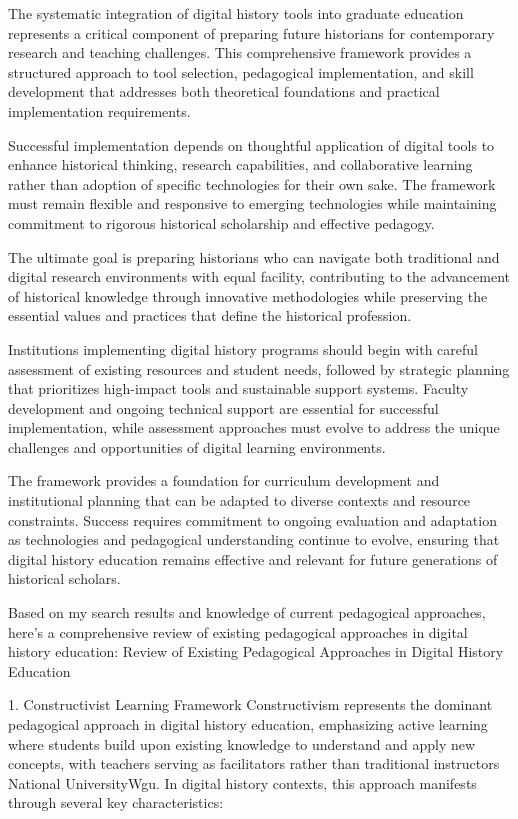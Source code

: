 The systematic integration of digital history tools into graduate education represents a critical component of preparing future historians for contemporary research and teaching challenges. This comprehensive framework provides a structured approach to tool selection, pedagogical implementation, and skill development that addresses both theoretical foundations and practical implementation requirements.

Successful implementation depends on thoughtful application of digital tools to enhance historical thinking, research capabilities, and collaborative learning rather than adoption of specific technologies for their own sake. The framework must remain flexible and responsive to emerging technologies while maintaining commitment to rigorous historical scholarship and effective pedagogy.

The ultimate goal is preparing historians who can navigate both traditional and digital research environments with equal facility, contributing to the advancement of historical knowledge through innovative methodologies while preserving the essential values and practices that define the historical profession.

Institutions implementing digital history programs should begin with careful assessment of existing resources and student needs, followed by strategic planning that prioritizes high-impact tools and sustainable support systems. Faculty development and ongoing technical support are essential for successful implementation, while assessment approaches must evolve to address the unique challenges and opportunities of digital learning environments.

The framework provides a foundation for curriculum development and institutional planning that can be adapted to diverse contexts and resource constraints. Success requires commitment to ongoing evaluation and adaptation as technologies and pedagogical understanding continue to evolve, ensuring that digital history education remains effective and relevant for future generations of historical scholars.

Based on my search results and knowledge of current pedagogical approaches, here's a comprehensive review of existing pedagogical approaches in digital history education:
Review of Existing Pedagogical Approaches in Digital History Education

1. Constructivist Learning Framework
Constructivism represents the dominant pedagogical approach in digital history education, emphasizing active learning where students build upon existing knowledge to understand and apply new concepts, with teachers serving as facilitators rather than traditional instructors National UniversityWgu. In digital history contexts, this approach manifests through several key characteristics:

